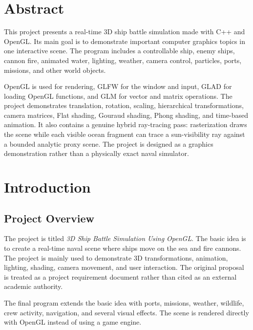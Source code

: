 \documentclass[12pt,a4paper]{report}
\begin{document}
\chapter*{Abstract}
This project presents a real-time 3D ship battle simulation made with C++ and OpenGL. Its main goal is to demonstrate important computer graphics topics in one interactive scene. The program includes a controllable ship, enemy ships, cannon fire, animated water, lighting, weather, camera control, particles, ports, missions, and other world objects.

OpenGL is used for rendering, GLFW for the window and input, GLAD for loading OpenGL functions, and GLM for vector and matrix operations. The project demonstrates translation, rotation, scaling, hierarchical transformations, camera matrices, Flat shading, Gouraud shading, Phong shading, and time-based animation. It also contains a genuine hybrid ray-tracing pass: rasterization draws the scene while each visible ocean fragment can trace a sun-visibility ray against a bounded analytic proxy scene. The project is designed as a graphics demonstration rather than a physically exact naval simulator.

\tableofcontents
\clearpage

\setcounter{page}{1}

\chapter{Introduction}

\section{Project Overview}
The project is titled \emph{3D Ship Battle Simulation Using OpenGL}. The basic idea is to create a real-time naval scene where ships move on the sea and fire cannons. The project is mainly used to demonstrate 3D transformations, animation, lighting, shading, camera movement, and user interaction. The original proposal is treated as a project requirement document rather than cited as an external academic authority.

The final program extends the basic idea with ports, missions, weather, wildlife, crew activity, navigation, and several visual effects. The scene is rendered directly with OpenGL instead of using a game engine.
\end{document}

